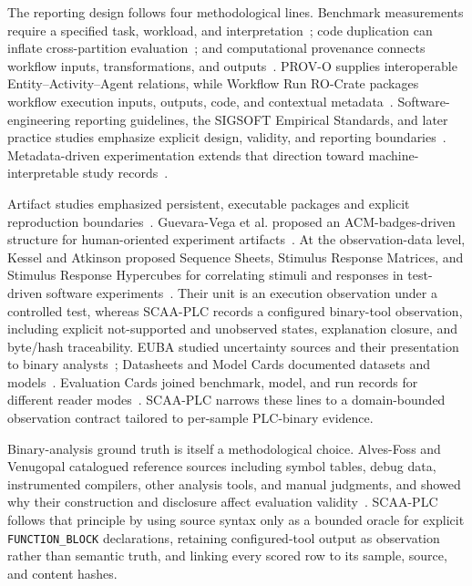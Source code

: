 \documentclass[a4paper,fleqn]{cas-dc}
\begin{document}
The reporting design follows four methodological lines. Benchmark measurements require a specified task, workload, and interpretation~\citep{sim_benchmarking2003}; code duplication can inflate cross-partition evaluation~\citep{allamanis2019adverse}; and computational provenance connects workflow inputs, transformations, and outputs~\citep{freire_provenance2008}. PROV-O supplies interoperable Entity--Activity--Agent relations, while Workflow Run RO-Crate packages workflow execution inputs, outputs, code, and contextual metadata~\citep{w3c_prov_o2013,leo_workflow_run_rocrate2024}. Software-engineering reporting guidelines, the SIGSOFT Empirical Standards, and later practice studies emphasize explicit design, validity, and reporting boundaries~\citep{kitchenham_reporting2008,revoredo_reporting2021,ralph_empirical_standards2021}. Metadata-driven experimentation extends that direction toward machine-interpretable study records~\citep{santana_metadata2026}.

Artifact studies emphasized persistent, executable packages and explicit reproduction boundaries~\citep{heumueller_software_artifacts2020,olszewski_replicability2025}. Guevara-Vega et al. proposed an ACM-badges-driven structure for human-oriented experiment artifacts~\citep{guevara_vega_research_artifacts2024}. At the observation-data level, Kessel and Atkinson proposed Sequence Sheets, Stimulus Response Matrices, and Stimulus Response Hypercubes for correlating stimuli and responses in test-driven software experiments~\citep{kessel_atkinson_open_science2024}. Their unit is an execution observation under a controlled test, whereas SCAA-PLC records a configured binary-tool observation, including explicit not-supported and unobserved states, explanation closure, and byte/hash traceability. EUBA studied uncertainty sources and their presentation to binary analysts~\citep{euba_sandia2021}; Datasheets and Model Cards documented datasets and models~\citep{datasheets_for_datasets,model_cards}. Evaluation Cards joined benchmark, model, and run records for different reader modes~\citep{evaluation_cards_arxiv2026}. SCAA-PLC narrows these lines to a domain-bounded observation contract tailored to per-sample PLC-binary evidence.

Binary-analysis ground truth is itself a methodological choice. Alves-Foss and Venugopal catalogued reference sources including symbol tables, debug data, instrumented compilers, other analysis tools, and manual judgments, and showed why their construction and disclosure affect evaluation validity~\citep{alves_foss_ground_truth2022}. SCAA-PLC follows that principle by using source syntax only as a bounded oracle for explicit \texttt{FUNCTION\_BLOCK} declarations, retaining configured-tool output as observation rather than semantic truth, and linking every scored row to its sample, source, and content hashes.
\end{document}
